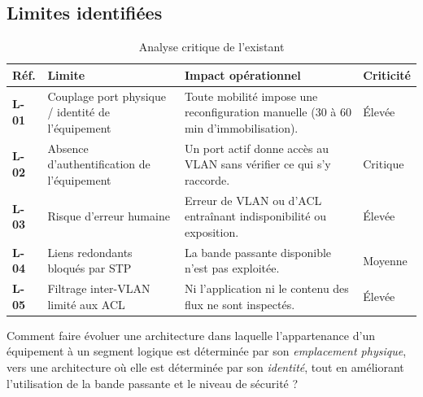\documentclass[11pt,a4paper]{article}
\newcommand{\rid}[1]{\textcolor{primary}{\textbf{\small #1}}}
\begin{document}
\subsection{Limites identifiées}
\begin{table}[H]
\centering
\caption{Analyse critique de l'existant}
\begin{tabularx}{\textwidth}{L{1.3cm} L{4.5cm} Y C{1.6cm}}
\toprule
{}\textbf{Réf.} & \textbf{Limite} & \textbf{Impact opérationnel} & \textbf{Criticité} \\
\midrule
\rid{L-01} & Couplage port physique / identité de l'équipement & Toute mobilité impose une reconfiguration manuelle (30 à 60 min d'immobilisation). & Élevée \\
\rid{L-02} & Absence d'authentification de l'équipement & Un port actif donne accès au VLAN sans vérifier ce qui s'y raccorde. & Critique \\
\rid{L-03} & Risque d'erreur humaine & Erreur de VLAN ou d'ACL entraînant indisponibilité ou exposition. & Élevée \\
\rid{L-04} & Liens redondants bloqués par STP & La bande passante disponible n'est pas exploitée. & Moyenne \\
\rid{L-05} & Filtrage inter-VLAN limité aux ACL & Ni l'application ni le contenu des flux ne sont inspectés. & Élevée \\
\bottomrule
\end{tabularx}
\end{table}

\begin{notebox}[Problématique]
Comment faire évoluer une architecture dans laquelle l'appartenance d'un équipement à un segment logique est déterminée par son \emph{emplacement physique}, vers une architecture où elle est déterminée par son \emph{identité}, tout en améliorant l'utilisation de la bande passante et le niveau de sécurité ?
\end{notebox}
\end{document}
